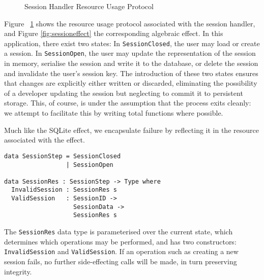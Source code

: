 \begin{figure}[htpb!]
\centering
{}
\caption{Session Handler Resource Usage Protocol}
\label{fig:sessionstates}
\end{figure}

Figure ~\ref{fig:sessionstates} shows the resource usage protocol associated
with the session handler, and Figure \ref{fig:sessioneffect} the corresponding
algebraic effect. In this application, there exist two states:
In \texttt{SessionClosed}, the user may load or create a
session.
In \texttt{SessionOpen}, the user may update the
representation of the session in memory, serialise the session and write it to
the database, or delete the session and invalidate the user's session key. The
introduction of these two states ensures that changes are explicitly either
written or discarded, eliminating the possibility of a developer updating the
session but neglecting to commit it to persistent storage. This, of course, is
under the assumption that the process exits cleanly: we attempt to facilitate
this by writing total functions where possible.

Much like the SQLite effect, we encapsulate failure by reflecting it in the
resource associated with the effect. 

\begin{Verbatim}
data SessionStep = SessionClosed
                 | SessionOpen

data SessionRes : SessionStep -> Type where
  InvalidSession : SessionRes s  
  ValidSession   : SessionID -> 
                   SessionData -> 
                   SessionRes s
\end{Verbatim}
The \texttt{SessionRes} data type is parameterised over the current state, which determines which operations may be performed, and has two constructors: \texttt{InvalidSession} and \texttt{ValidSession}. If an operation such as creating a new session fails, no further side-effecting calls will be made, in turn preserving integrity. 


